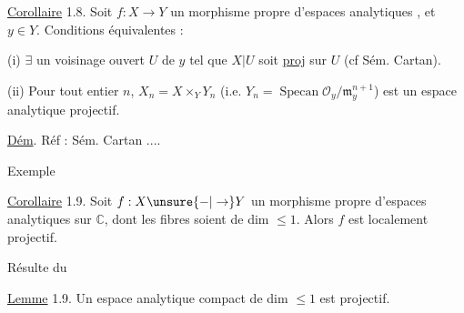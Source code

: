 \uline{Corollaire} 1.8. Soit $f:X\to Y$ un morphisme propre d'espaces analytiques , et $y\in Y$. Conditions équivalentes :

(i) $\exists$ un voisinage ouvert $U$ de $y$ tel que $X|U$ soit \uline{proj} sur $U$ (cf Sém. Cartan).

(ii) Pour tout entier $n$, $X_n=X\times_Y Y_n$ (i.e. $Y_n=\operatorname{Specan}\mathcal O_y/\mathfrak m_y^{n+1}$) est  un espace analytique projectif.

\uline{Dém}. Réf : Sém. Cartan ....

Exemple

\uline{Corollaire}  1.9.  Soit $f:X\unsure{-|\to}Y$ un morphisme propre d'espaces analytiques sur $\mathbb C$,  dont les fibres soient de dim $\leq 1$. Alors $f$ est localement projectif.

Résulte du

\uline{Lemme} 1.9. Un espace analytique compact de dim $\leq 1$ est projectif.


